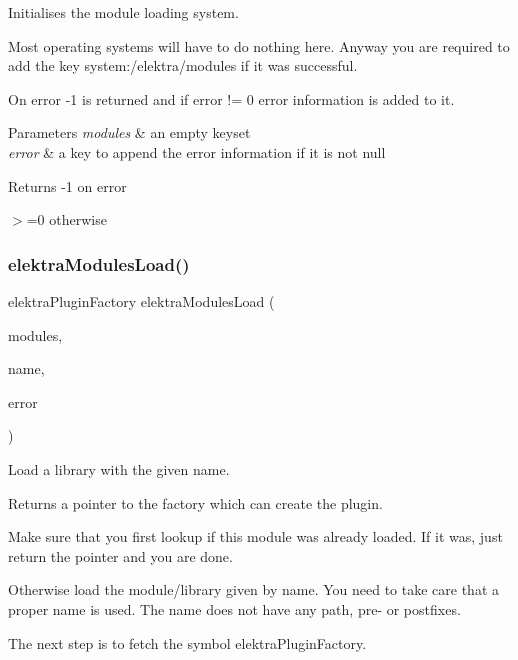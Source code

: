 Initialises the module loading system. 

Most operating systems will have to do nothing here. Anyway you are required to add the key system\+:/elektra/modules if it was successful.

On error -\/1 is returned and if error != 0 error information is added to it.


\begin{DoxyParams}{Parameters}
{\em modules} & an empty keyset \\
\hline
{\em error} & a key to append the error information if it is not null \\
\hline
\end{DoxyParams}
\begin{DoxyReturn}{Returns}
-\/1 on error 

$>$=0 otherwise 
\end{DoxyReturn}
\mbox{\label{group__modules_ga09300fbf0e0cfc9dc80bb877b00117c0}} 
\subsubsection{\texorpdfstring{elektra\+Modules\+Load()}{elektraModulesLoad()}}
{\footnotesize\ttfamily elektra\+Plugin\+Factory elektra\+Modules\+Load (\begin{DoxyParamCaption}\item[{Key\+Set $\ast$}]{modules,  }\item[{const char $\ast$}]{name,  }\item[{Key $\ast$}]{error }\end{DoxyParamCaption})}



Load a library with the given name. 

\begin{DoxyReturn}{Returns}
a pointer to the factory which can create the plugin.
\end{DoxyReturn}
Make sure that you first lookup if this module was already loaded. If it was, just return the pointer and you are done.

Otherwise load the module/library given by name. You need to take care that a proper name is used. The name does not have any path, pre-\/ or postfixes.

The next step is to fetch the symbol elektra\+Plugin\+Factory.

